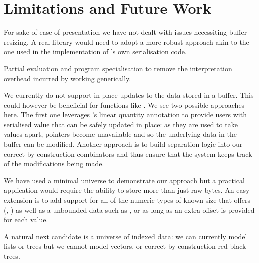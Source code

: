 \section{Limitations and Future Work}

For sake of ease of presentation we have not dealt with issues necessiting
buffer resizing. A real library would need to adopt a more robust approach
akin to the one used in the implementation of \idris{}'s own serialisation
code.

Partial evaluation and program specialisation to remove the interpretation
overhead incurred by working generically.

We currently do not support in-place updates to the data stored in a buffer.
This could however be beneficial for functions like .
%
We see two possible approaches here. The first one leverages \idris{}'s
linear quantity annotation to provide users with serialised value that
can be safely updated in place: as they are used to take values apart,
pointers become unavailable and so the underlying data in the buffer can
be modified.
%
Another approach is to build separation logic into our correct-by-construction
combinators and thus ensure that the system keeps track of the modifications
being made.

We have used a minimal universe to demonstrate our approach but a practical
application would require the ability to store more than just raw bytes.
An easy extension is to add support for all of the numeric types of
known size that \idris{} offers
(, )
as well as a unbounded data such as , or 
as long as an extra offset is provided for each value.

A natural next candidate is a universe of indexed data: we can currently
model lists or trees but we cannot model vectors, or correct-by-construction
red-black trees.
